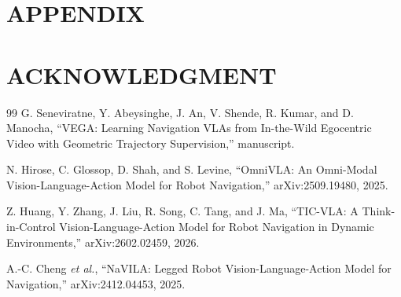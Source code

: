 \documentclass[letterpaper, 10 pt, conference]{ieeeconf}  %
\newif\ifincludesupplementary
\begin{document}



\section*{APPENDIX}


\section*{ACKNOWLEDGMENT}





\begin{thebibliography}{99}
    G. Seneviratne, Y. Abeysinghe, J. An, V. Shende, R. Kumar, and
    D. Manocha, ``VEGA: Learning Navigation VLAs from In-the-Wild
    Egocentric Video with Geometric Trajectory Supervision,'' manuscript.

    N. Hirose, C. Glossop, D. Shah, and S. Levine,
    ``OmniVLA: An Omni-Modal Vision-Language-Action Model for Robot
    Navigation,'' arXiv:2509.19480, 2025.

    Z. Huang, Y. Zhang, J. Liu, R. Song, C. Tang, and J. Ma,
    ``TIC-VLA: A Think-in-Control Vision-Language-Action Model for Robot
    Navigation in Dynamic Environments,'' arXiv:2602.02459, 2026.

    A.-C. Cheng \emph{et al.}, ``NaVILA: Legged Robot
    Vision-Language-Action Model for Navigation,'' arXiv:2412.04453, 2025.

\end{thebibliography}




\ifincludesupplementary
  \clearpage
  \nobalance
  \onecolumn
  
\fi
\end{document}
